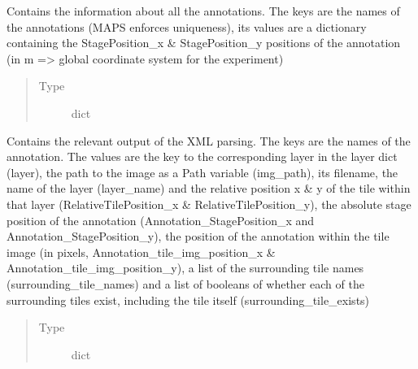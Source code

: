 \documentclass[letterpaper,10pt,english]{sphinxmanual}
\begin{document}
\begin{fulllineitems}
\begin{fulllineitems}
\begin{quote}
\begin{description}
\end{description}\end{quote}

\end{fulllineitems}


\begin{fulllineitems}
\label{\detokenize{index:sites_of_interest_parser.MapsXmlParser.annotations}}
Contains the information about all the annotations. The keys are the names of the
annotations (MAPS enforces uniqueness), its values are a dictionary containing the StagePosition\_x \&
StagePosition\_y positions of the annotation (in m =\textgreater{} global coordinate system for the experiment)
\begin{quote}\begin{description}
\item[{Type}] \leavevmode
dict

\end{description}\end{quote}

\end{fulllineitems}


\begin{fulllineitems}
\label{\detokenize{index:sites_of_interest_parser.MapsXmlParser.annotation_tiles}}
Contains the relevant output of the XML parsing. The keys are the names of the
annotation. The values are the key to the corresponding layer in the layer dict (layer), the path to the
image as a Path variable (img\_path), its filename, the name of the layer (layer\_name) and the relative
position x \& y of the tile within that layer (RelativeTilePosition\_x \& RelativeTilePosition\_y), the
absolute stage position of the annotation (Annotation\_StagePosition\_x and Annotation\_StagePosition\_y), the
position of the annotation within the tile image (in pixels, Annotation\_tile\_img\_position\_x \&
Annotation\_tile\_img\_position\_y), a list of the surrounding tile names (surrounding\_tile\_names) and a list of
booleans of whether each of the surrounding tiles exist, including the tile itself (surrounding\_tile\_exists)
\begin{quote}\begin{description}
\item[{Type}] \leavevmode
dict


\end{description}
\end{quote}
\end{fulllineitems}
\end{fulllineitems}
\end{document}
